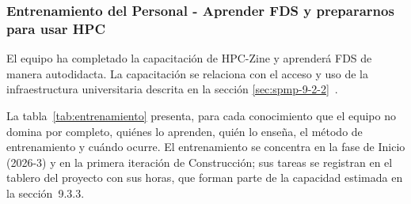 
\subsubsection{Entrenamiento del Personal - Aprender FDS y prepararnos para usar HPC}\label{sec:spmp-9-2-1}

El equipo ha completado la capacitación de HPC-Zine y aprenderá FDS de manera autodidacta. La capacitación se relaciona con el acceso y uso de la infraestructura universitaria descrita en la sección \ref{sec:spmp-9-2-2}~\cite{adaptacion2026}.

La tabla~\ref{tab:entrenamiento} presenta, para cada conocimiento que el equipo no domina por completo, quiénes lo aprenden, quién lo enseña, el método de entrenamiento y cuándo ocurre. El entrenamiento se concentra en la fase de Inicio (2026-3) y en la primera iteración de Construcción; sus tareas se registran en el tablero del proyecto con sus horas, que forman parte de la capacidad estimada en la sección~9.3.3.

